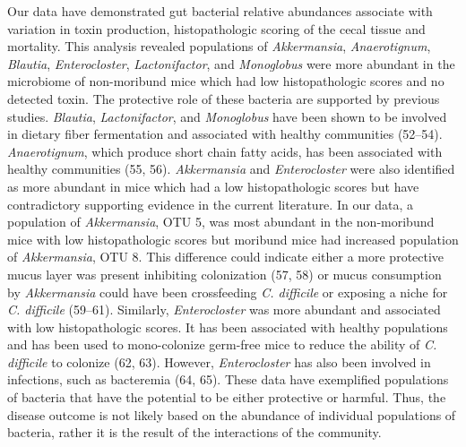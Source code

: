 \documentclass[
  12pt,
]{article}
\begin{document}
Our data have demonstrated gut bacterial relative abundances associate
with variation in toxin production, histopathologic scoring of the cecal
tissue and mortality. This analysis revealed populations of
\emph{Akkermansia}, \emph{Anaerotignum}, \emph{Blautia},
\emph{Enterocloster}, \emph{Lactonifactor}, and \emph{Monoglobus} were
more abundant in the microbiome of non-moribund mice which had low
histopathologic scores and no detected toxin. The protective role of
these bacteria are supported by previous studies. \emph{Blautia},
\emph{Lactonifactor}, and \emph{Monoglobus} have been shown to be
involved in dietary fiber fermentation and associated with healthy
communities (52--54). \emph{Anaerotignum}, which produce short chain
fatty acids, has been associated with healthy communities (55, 56).
\emph{Akkermansia} and \emph{Enterocloster} were also identified as more
abundant in mice which had a low histopathologic scores but have
contradictory supporting evidence in the current literature. In our
data, a population of \emph{Akkermansia}, OTU 5, was most abundant in
the non-moribund mice with low histopathologic scores but moribund mice
had increased population of \emph{Akkermansia}, OTU 8. This difference
could indicate either a more protective mucus layer was present
inhibiting colonization (57, 58) or mucus consumption by
\emph{Akkermansia} could have been crossfeeding \emph{C. difficile} or
exposing a niche for \emph{C. difficile} (59--61). Similarly,
\emph{Enterocloster} was more abundant and associated with low
histopathologic scores. It has been associated with healthy populations
and has been used to mono-colonize germ-free mice to reduce the ability
of \emph{C. difficile} to colonize (62, 63). However,
\emph{Enterocloster} has also been involved in infections, such as
bacteremia (64, 65). These data have exemplified populations of bacteria
that have the potential to be either protective or harmful. Thus, the
disease outcome is not likely based on the abundance of individual
populations of bacteria, rather it is the result of the interactions of
the community.
\end{document}
